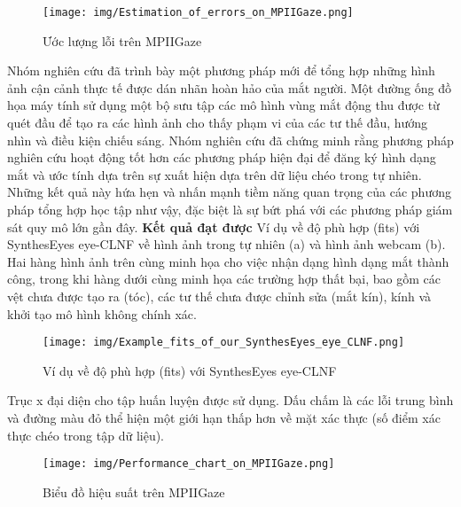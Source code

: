 \begin{center}
    \begin{figure}[h!]
    \begin{center}
     \texttt{[image: img/Estimation\_of\_errors\_on\_MPIIGaze.png]}
    \end{center}
    \caption{Ước lượng lỗi trên MPIIGaze}
    \label{refhinh20}
    \end{figure}
\end{center}
Nhóm nghiên cứu đã trình bày một phương pháp mới để tổng hợp những hình ảnh cận cảnh thực tế được dán nhãn hoàn hảo của mắt người. Một đường ống đồ họa máy tính sử dụng một bộ sưu tập các mô hình vùng mắt động thu được từ quét đầu để tạo ra các hình ảnh cho thấy phạm vi của các tư thế đầu, hướng nhìn và điều kiện chiếu sáng. Nhóm nghiên cứu đã chứng minh rằng phương pháp nghiên cứu hoạt động tốt hơn các phương pháp hiện đại để đăng ký hình dạng mắt và ước tính dựa trên sự xuất hiện dựa trên dữ liệu chéo trong tự nhiên. Những kết quả này hứa hẹn và nhấn mạnh tiềm năng quan trọng của các phương pháp tổng hợp học tập như vậy, đặc biệt là sự bứt phá với các phương pháp giám sát quy mô lớn gần đây.
\textbf{Kết quả đạt được}
Ví dụ về độ phù hợp (fits) với SynthesEyes eye-CLNF về hình ảnh trong tự nhiên (a) và hình ảnh webcam (b). Hai hàng hình ảnh trên cùng minh họa cho việc nhận dạng hình dạng mắt thành công, trong khi hàng dưới cùng minh họa các trường hợp thất bại, bao gồm các vệt chưa được tạo ra (tóc), các tư thế chưa được chỉnh sửa (mắt kín), kính và khởi tạo mô hình không chính xác.
\begin{center}
    \begin{figure}[h!]
    \begin{center}
     \texttt{[image: img/Example\_fits\_of\_our\_SynthesEyes\_eye\_CLNF.png]}
    \end{center}
    \caption{Ví dụ về độ phù hợp (fits) với SynthesEyes eye-CLNF}
    \label{refhinh20}
    \end{figure}
\end{center}
Trục x đại diện cho tập huấn luyện được sử dụng. Dấu chấm là các lỗi trung bình và đường màu đỏ thể hiện một giới hạn thấp hơn về mặt xác thực (số điểm xác thực chéo trong tập dữ liệu).

\begin{center}
    \begin{figure}[h!]
    \begin{center}
     \texttt{[image: img/Performance\_chart\_on\_MPIIGaze.png]}
    \end{center}
    \caption{Biểu đồ hiệu suất trên MPIIGaze}
    \label{refhinh15}
    \end{figure}
\end{center}

